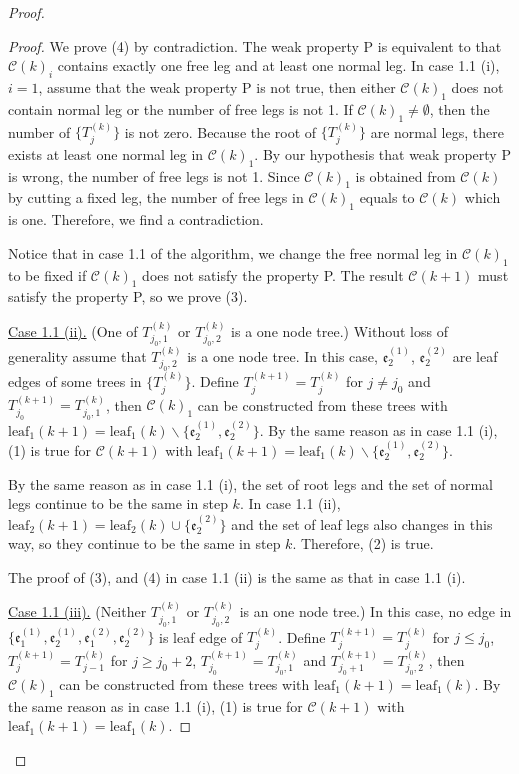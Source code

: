 \begin{proof}
\begin{proof}
We prove (4) by contradiction. The weak property P is equivalent to that $\mathcal{C}(k)_i$ contains exactly one free leg and at least one normal leg. In case 1.1 (i), $i=1$, assume that the weak property P is not true, then either $\mathcal{C}(k)_1$ does not contain normal leg or the number of free legs is not 1. If $\mathcal{C}(k)_1\ne \emptyset$, then the number of $\{T^{(k)}_{j}\}$ is not zero. Because the root of $\{T^{(k)}_{j}\}$ are normal legs, there exists at least one normal leg in $\mathcal{C}(k)_1$. By our hypothesis that weak property P is wrong, the number of free legs is not 1. Since $\mathcal{C}(k)_1$ is obtained from $\mathcal{C}(k)$ by cutting a fixed leg, the number of free legs in $\mathcal{C}(k)_1$ equals to  $\mathcal{C}(k)$ which is one. Therefore, we find a contradiction.

Notice that in case 1.1 of the algorithm, we change the free normal leg in $\mathcal{C}(k)_1$ to be fixed if $\mathcal{C}(k)_1$ does not satisfy the property P. The result $\mathcal{C}(k+1)$ must satisfy the property P, so we prove (3). 

\underline{Case 1.1 (ii).} (One of $T^{(k)}_{j_0,1}$ or $T^{(k)}_{j_0,2}$ is a one node tree.) Without loss of generality assume that $T^{(k)}_{j_0,2}$ is a one node tree. In this case, $\mathfrak{e}_{2}^{(1)}$, $\mathfrak{e}_{2}^{(2)}$ are leaf edges of some trees in $\{T_{j}^{(k)}\}$. Define $T^{(k+1)}_{j}=T^{(k)}_{j}$ for $j\ne j_0$ and $T^{(k+1)}_{j_0}=T^{(k)}_{j_0,1}$, then $\mathcal{C}(k)_1$ can be constructed from these trees with  $\text{leaf}_1(k+1)=\text{leaf}_1(k)\backslash\{\mathfrak{e}_{2}^{(1)}, \mathfrak{e}_{2}^{(2)}\}$. By the same reason as in case 1.1 (i), (1) is true for $\mathcal{C}(k+1)$ with $\text{leaf}_1(k+1)=\text{leaf}_1(k)\backslash\{\mathfrak{e}_{2}^{(1)}, \mathfrak{e}_{2}^{(2)}\}$.

By the same reason as in case 1.1 (i), the set of root legs and the set of normal legs continue to be the same in step $k$. In case 1.1 (ii), $\text{leaf}_2(k+1)=\text{leaf}_2(k)\cup \{ \mathfrak{e}_{2}^{(2)}\}$ and the set of leaf legs also changes in this way, so they continue to be the same in step $k$. Therefore, (2) is true.

The proof of (3), and (4) in case 1.1 (ii) is the same as that in case 1.1 (i).


\underline{Case 1.1 (iii).} (Neither $T^{(k)}_{j_0,1}$ or $T^{(k)}_{j_0,2}$ is an one node tree.) In this case, no edge in $\{\mathfrak{e}_{1}^{(1)}, \mathfrak{e}_{2}^{(1)}, \mathfrak{e}_{1}^{(2)}, \mathfrak{e}_{2}^{(2)}\}$ is leaf edge of $T_{j}^{(k)}$. Define $T^{(k+1)}_{j}=T^{(k)}_{j}$ for $j\le j_0$, $T^{(k+1)}_{j}=T^{(k)}_{j-1}$ for $j\ge j_0+2$, $T^{(k+1)}_{j_0}=T^{(k)}_{j_0,1}$ and $T^{(k+1)}_{j_0+1}=T^{(k)}_{j_0,2}$, then $\mathcal{C}(k)_1$ can be constructed from these trees with  $\text{leaf}_1(k+1)=\text{leaf}_1(k)$. By the same reason as in case 1.1 (i), (1) is true for $\mathcal{C}(k+1)$ with $\text{leaf}_1(k+1)=\text{leaf}_1(k)$.


\end{proof}
\end{proof}
